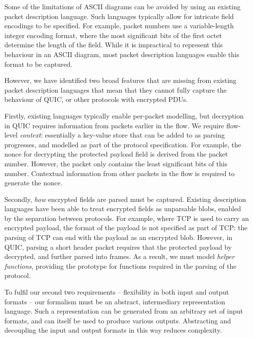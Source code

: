 \documentclass[10pt,sigconf]{acmart}
\begin{document}
Some of the limitations of ASCII diagrams can be avoided by using an existing packet
description language. Such languages typically allow for intricate field encodings to be
specified. For example, packet numbers use a variable-length integer encoding format,
where the most significant bits of the first octet determine the length of the field.
While it is impractical to represent this behaviour in an ASCII diagram, most packet
description languages enable this format to be captured.

However, we have identified two broad features that are missing from existing packet
description languages that mean that they cannot fully capture the behaviour of QUIC, or
other protocols with encrypted PDUs.

Firstly, existing languages typically enable per-packet modelling, but decryption in QUIC
requires information from packets earlier in the flow. We require flow-level
\emph{context}: essentially a key-value store that can be added to as parsing progresses,
and modelled as part of the protocol specification. For example, the nonce for decrypting
the protected payload field is derived from the packet number. However, the packet only
contains the least significant bits of this number. Contextual information from other
packets in the flow is required to generate the nonce.

Secondly, \emph{how} encrypted fields are parsed must be captured. Existing description
languages have been able to treat encrypted fields as unparsable blobs, enabled by the
separation between protocols. For example, where TCP is used to carry an encrypted
payload, the format of the payload is not specified as part of TCP: the parsing of TCP can
end with the payload as an encrypted blob. However, in QUIC, parsing a short header packet
requires that the protected payload by decrypted, and further parsed into frames. As a
result, we must model \emph{helper functions}, providing the prototype for functions
required in the parsing of the protocol.

To fulfil our second two requirements -- flexibility in both input and output formats --
our formalism must be an abstract, intermediary representation language. Such a
representation can be generated from an arbitrary set of input formats, and can itself be
used to produce various outputs. Abstracting and decoupling the input and output formats
in this way reduces complexity.

\end{document}
